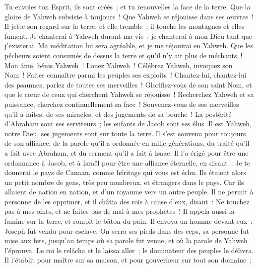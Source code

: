 \begin{multicols}{2}
Tu envoies ton Esprit, ils sont créés~; et tu renouvelles la face de la terre.
Que la gloire de Yahweh subsiste à toujours~! Que Yahweh se réjouisse dans ses œuvres~!
Il jette son regard sur la terre, et elle tremble~; il touche les montagnes et elles fument.
Je chanterai à Yahweh durant ma vie~; je chanterai à mon Dieu tant que j'existerai.
Ma méditation lui sera agréable, et je me réjouirai en Yahweh.
Que les pécheurs soient consumés de dessus la terre et qu'il n'y ait plus de méchants~! Mon âme, bénis Yahweh~! Louez Yahweh~!
\VerseOne{}Célébrez Yahweh, invoquez son Nom~! Faites connaître parmi les peuples ses exploits~!
Chantez-lui, chantez-lui des psaumes, parlez de toutes ses merveilles~!
Glorifiez-vous de son saint Nom, et que le cœur de ceux qui cherchent Yahweh se réjouisse~!
Recherchez Yahweh et sa puissance, cherchez continuellement sa face~!
Souvenez-vous de ses merveilles qu'il a faites, de ses miracles, et des jugements de sa bouche~!
La postérité d'Abraham sont ses serviteurs~; les enfants de Jacob sont ses élus.
Il est Yahweh, notre Dieu, ses jugements sont sur toute la terre.
Il s'est souvenu pour toujours de son alliance, de la parole qu'il a ordonnée en mille générations,
du traité qu'il a fait avec Abraham, et du serment qu'il a fait à Isaac.
Il l'a érigé pour être une ordonnance à Jacob, et à Israël pour être une alliance éternelle,
en disant~: Je te donnerai le pays de Canaan, comme héritage qui vous est échu.
Ils étaient alors un petit nombre de gens, très peu nombreux, et étrangers dans le pays.
Car ils allaient de nation en nation, et d'un royaume vers un autre peuple.
Il ne permit à personne de les opprimer, et il châtia des rois à cause d'eux,
disant~: Ne touchez pas à mes oints, et ne faites pas de mal à mes prophètes~!
Il appela aussi la famine sur la terre, et rompit le bâton du pain.
Il envoya un homme devant eux~; Joseph fut vendu pour esclave.
On serra ses pieds dans des ceps, sa personne fut mise aux fers,
jusqu'au temps où sa parole fut venue, et où la parole de Yahweh l'éprouva.
Le roi le relâcha et le laissa aller~; le dominateur des peuples le délivra.
Il l'établit pour maître sur sa maison, et pour gouverneur sur tout son domaine~;

\end{multicols}
